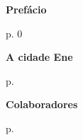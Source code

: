 \thispagestyle{empty}


\begin{vplace}
\begin{centering}
\textbf{Prefácio}

\medskip

p. 0\pageref{prefacio}

\medskip

\textbf{A cidade Ene}

\medskip

p. \pageref{cidade}

\medskip

\textbf{Colaboradores}

\medskip

p. \pageref{colaboradores}

\end{centering}
\end{vplace}